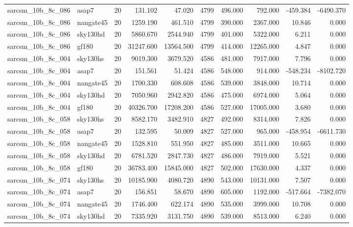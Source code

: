 \begin{longtable}{llrrrrrrrr}
sarcsm\_10b\_8c\_086 & asap7 & 20 & 131.102 & 47.020 & 4799 & 496.000 & 792.000 & -459.384 & -6490.370 \\
sarcsm\_10b\_8c\_086 & nangate45 & 20 & 1259.190 & 461.510 & 4799 & 390.000 & 2367.000 & 10.846 & 0.000 \\
sarcsm\_10b\_8c\_086 & sky130hd & 20 & 5860.670 & 2544.940 & 4799 & 401.000 & 5322.000 & 6.211 & 0.000 \\
sarcsm\_10b\_8c\_086 & gf180 & 20 & 31247.600 & 13564.500 & 4799 & 414.000 & 12265.000 & 4.847 & 0.000 \\
sarcsm\_10b\_8c\_004 & sky130hs & 20 & 9019.300 & 3679.520 & 4586 & 481.000 & 7917.000 & 7.796 & 0.000 \\
sarcsm\_10b\_8c\_004 & asap7 & 20 & 151.561 & 51.424 & 4586 & 548.000 & 914.000 & -548.234 & -8102.720 \\
sarcsm\_10b\_8c\_004 & nangate45 & 20 & 1700.330 & 608.608 & 4586 & 539.000 & 3848.000 & 10.714 & 0.000 \\
sarcsm\_10b\_8c\_004 & sky130hd & 20 & 7050.960 & 2942.820 & 4586 & 475.000 & 6974.000 & 5.064 & 0.000 \\
sarcsm\_10b\_8c\_004 & gf180 & 20 & 40326.700 & 17208.200 & 4586 & 527.000 & 17005.000 & 3.680 & 0.000 \\
sarcsm\_10b\_8c\_058 & sky130hs & 20 & 8582.170 & 3482.910 & 4827 & 492.000 & 8314.000 & 7.826 & 0.000 \\
sarcsm\_10b\_8c\_058 & asap7 & 20 & 132.595 & 50.009 & 4827 & 527.000 & 965.000 & -458.954 & -6611.730 \\
sarcsm\_10b\_8c\_058 & nangate45 & 20 & 1528.810 & 551.950 & 4827 & 485.000 & 3511.000 & 10.665 & 0.000 \\
sarcsm\_10b\_8c\_058 & sky130hd & 20 & 6781.520 & 2847.730 & 4827 & 486.000 & 7919.000 & 5.521 & 0.000 \\
sarcsm\_10b\_8c\_058 & gf180 & 20 & 36783.400 & 15845.000 & 4827 & 502.000 & 17630.000 & 4.337 & 0.000 \\
sarcsm\_10b\_8c\_074 & sky130hs & 20 & 10185.900 & 4080.720 & 4890 & 543.000 & 10131.000 & 7.507 & 0.000 \\
sarcsm\_10b\_8c\_074 & asap7 & 20 & 156.851 & 58.670 & 4890 & 605.000 & 1192.000 & -517.664 & -7382.070 \\
sarcsm\_10b\_8c\_074 & nangate45 & 20 & 1746.400 & 622.174 & 4890 & 535.000 & 3999.000 & 10.708 & 0.000 \\
sarcsm\_10b\_8c\_074 & sky130hd & 20 & 7335.920 & 3131.750 & 4890 & 539.000 & 8513.000 & 6.240 & 0.000 \\

\end{longtable}
